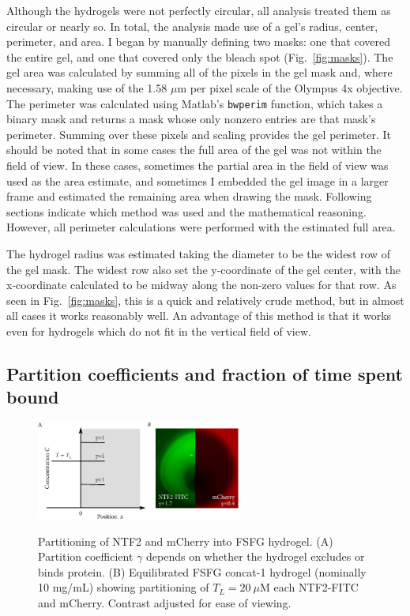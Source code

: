 Although the hydrogels were not perfectly circular, all analysis treated them as circular or nearly so.  In total, the analysis made use of a gel's radius, center, perimeter, and area.  I began by manually defining two masks: one that covered the entire gel, and one that covered only the bleach spot (Fig.~\ref{fig:masks}).  The gel area was calculated by summing all of the pixels in the gel mask and, where necessary, making use of the 1.58 $\mu$m per pixel scale of the Olympus 4x objective.  The perimeter was calculated using Matlab's \texttt{bwperim} function, which takes a binary mask and returns a mask whose only nonzero entries are that mask's perimeter.  Summing over these pixels and scaling provides the gel perimeter.  It should be noted that in some cases the full area of the gel was not within the field of view.  In these cases, sometimes the partial area in the field of view was used as the area estimate, and sometimes I embedded the gel image in a larger frame and estimated the remaining area when drawing the mask.  Following sections indicate which method was used and the mathematical reasoning.  However, all perimeter calculations were performed with the estimated full area.

The hydrogel radius was estimated taking the diameter to be the widest row of the gel mask.  The widest row also set the y-coordinate of the gel center, with the x-coordinate calculated to be midway along the non-zero values for that row.  As seen in Fig.~\ref{fig:masks}, this is a quick and relatively crude method, but in almost all cases it works reasonably well.  An advantage of this method is that it works even for hydrogels which do not fit in the vertical field of view.

\subsection{Partition coefficients and fraction of time spent bound}
\label{sec:part-coeff}

\begin{figure} 
\caption{Partitioning of NTF2 and mCherry into FSFG hydrogel.  (A) Partition coefficient $\gamma$ depends on whether the hydrogel excludes or binds protein. (B) Equilibrated FSFG concat-1 hydrogel (nominally 10 mg/mL) showing partitioning of $T_L = 20\ \mu$M each NTF2-FITC and mCherry.  Contrast adjusted for ease of viewing.\\}
\centering
\includegraphics[width=0.6\textwidth]{figs/ch04/partition.pdf}
\label{fig:partition}
\end{figure}

